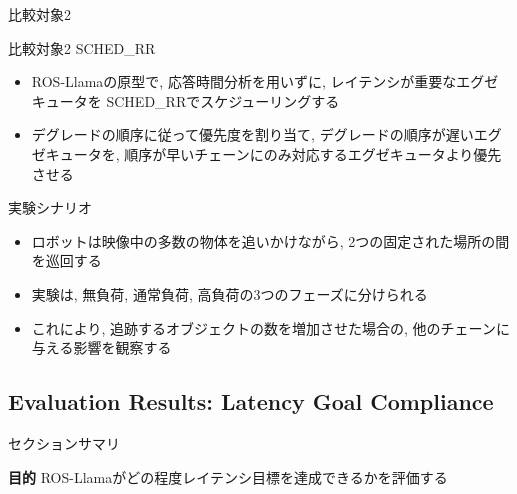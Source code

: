 \begin{frame}{比較対象2}
    \begin{block}{比較対象2 SCHED\_RR}
        \begin{itemize}
            \item ROS-Llamaの原型で, 応答時間分析を用いずに, レイテンシが重要なエグゼキュータを SCHED\_RRでスケジューリングする
            \item デグレードの順序に従って優先度を割り当て, デグレードの順序が遅いエグゼキュータを, 順序が早いチェーンにのみ対応するエグゼキュータより優先させる
        \end{itemize}
    \end{block}
\end{frame}



\begin{frame}{実験シナリオ}
    \begin{itemize}
        \item ロボットは映像中の多数の物体を追いかけながら, 2つの固定された場所の間を巡回する
        \item 実験は, 無負荷, 通常負荷, 高負荷の3つのフェーズに分けられる
        \item これにより, 追跡するオブジェクトの数を増加させた場合の, 他のチェーンに与える影響を観察する
    \end{itemize}
\end{frame}


\subsection{Evaluation Results: Latency Goal Compliance}
\label{ssec: evaluation results: latency goal compliance}

\begin{frame}{セクションサマリ}
    \begin{itembox}[l]{\textbf{目的}}
        ROS-Llamaがどの程度レイテンシ目標を達成できるかを評価する
    \end{itembox}
\end{frame}

